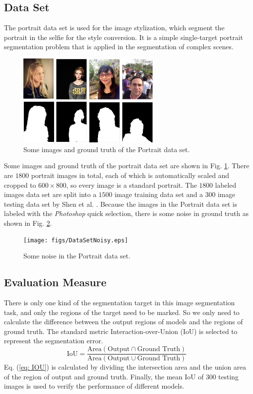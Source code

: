 \subsection{Data Set}
The portrait data set is used for the image stylization, which segment the portrait in the selfie for the style conversion. It is a simple single-target portrait segmentation problem that is applied in the segmentation of complex scenes.
\begin{figure}[ht]
    \centering
    \includegraphics[width = 7cm]{figs/PortraitDataSet.jpg}
    \caption{Some images and ground truth of the Portrait data set.}\label{fig: Some images and ground truth of Portrait data set}
\end{figure}
Some images and ground truth of the portrait data set are shown in Fig. \ref{fig: Some images and ground truth of Portrait data set}. There are $1800$ portrait images in total, each of which is automatically scaled and cropped to $600\times800$, so every image is a standard portrait. The $1800$ labeled images data set are split into a $1500$ image training data set and a $300$ image testing data set by Shen et al. \cite{FCN:segmentation:shen2016automatic}. Because the images in the Portrait data set is labeled with the \emph{Photoshop} quick selection, there is some noise in ground truth as shown in Fig. \ref{fig: Some noise in the Portrait data set}.
\begin{figure}[h]
    \centering
    \texttt{[image: figs/DataSetNoisy.eps]}
    \caption{Some noise in the Portrait data set.}\label{fig: Some noise in the Portrait data set}
\end{figure}

\subsection{Evaluation Measure}
There is only one kind of the segmentation target in this image segmentation task, and only the regions of the target need to be marked. So we only need to calculate the difference between the output regions of models and the regions of ground truth. The standard metric Interaction-over-Union (IoU) is selected to represent the segmentation error.
\begin{equation}\label{eq: IOU}
    \text{IoU} = \frac{\text{Area}(\text{Output} \cap \text{Ground Truth})}{\text{Area}(\text{Output} \cup \text{Ground Truth})}
\end{equation}
Eq. (\ref{eq: IOU}) is calculated by dividing the intersection area and the union area of the region of output and ground truth. Finally, the mean IoU of $300$ testing images is used to verify the performance of different models.

